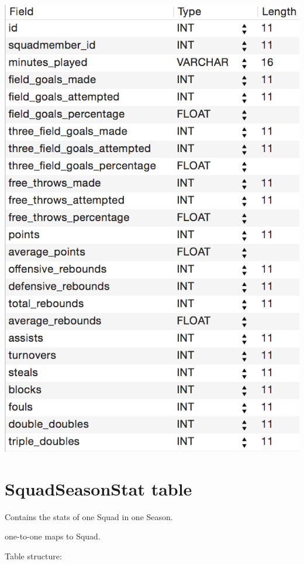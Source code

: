 \documentclass[letterpaper,10pt,english]{sphinxmanual}
\begin{document}
\includegraphics{PlayerSeasonStat_table.png}


\section{SquadSeasonStat table}
\label{_static/database:squadseasonstat-table}
Contains the stats of one Squad in one Season.

one-to-one maps to Squad.

Table structure:
\end{document}

